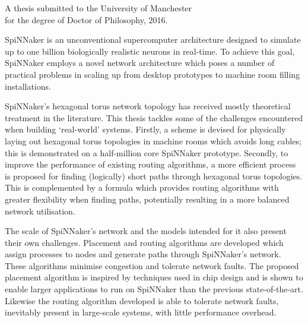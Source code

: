 {
	
	
	
	\vfill
	
	\begin{center}
		\textsc{\large\thesistitle}
		
		\vspace{0.5em}
		
		\thesisauthor
		
		\vspace{0.5em}
		
		A thesis submitted to the University of Manchester\\
		for the degree of Doctor of Philosophy, 2016.
	\end{center}
	
	\vfill
	
	
	SpiNNaker is an unconventional supercomputer architecture designed to
	simulate up to one billion biologically realistic neurons in real-time. To
	achieve this goal, SpiNNaker employs a novel network architecture which poses
	a number of practical problems in scaling up from desktop prototypes to
	machine room filling installations.
	
	SpiNNaker's hexagonal torus network topology has received mostly theoretical
	treatment in the literature. This thesis tackles some of the challenges
	encountered when building `real-world' systems.  Firstly, a scheme is devised
	for physically laying out hexagonal torus topologies in machine rooms which
	avoids long cables; this is demonstrated on a half-million core SpiNNaker
	prototype.  Secondly, to improve the performance of existing routing
	algorithms, a more efficient process is proposed for finding (logically)
	short paths through hexagonal torus topologies. This is complemented by a
	formula which provides routing algorithms with greater flexibility when
	finding paths, potentially resulting in a more balanced network utilisation.
	
	The scale of SpiNNaker's network and the models intended for it also present
	their own challenges. Placement and routing algorithms are developed which
	assign processes to nodes and generate paths through SpiNNaker's network.
	These algorithms minimise congestion and tolerate network faults. The
	proposed placement algorithm is inspired by techniques used in chip design
	and is shown to enable larger applications to run on SpiNNaker than the
	previous state-of-the-art. Likewise the routing algorithm developed is able
	to tolerate network faults, inevitably present in large-scale systems, with
	little performance overhead.
	
	
	\par%
}
